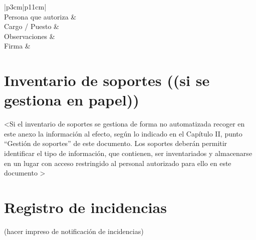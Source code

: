 \documentclass[a4paper,11pt,bibtotoc,noliststotoc]{scrbook}
\begin{document}
\begin{center}
\begin{supertabular}{|p{3cm}|p{11cm}|}
	\hline
	\\
	\hline
	Persona que autoriza &  \\
	\hline
	Cargo / Puesto & \\
	\hline
	Observaciones & \\
	\hline
	Firma & \\
	\hline
\end{supertabular}
\end{center}







\chapter{Inventario de soportes ((si se gestiona en papel))}

<Si el inventario de soportes se gestiona de forma no automatizada recoger en este
anexo la información al efecto, según lo indicado en el Capítulo II, punto “Gestión de
soportes” de este documento. Los soportes deberán permitir identificar el tipo de
información, que contienen, ser inventariados y almacenarse en un lugar con acceso
restringido al personal autorizado para ello en este documento >







\chapter{Registro de incidencias}
(hacer impreso de notificación de incidencias)




\backmatter


\end{document}
